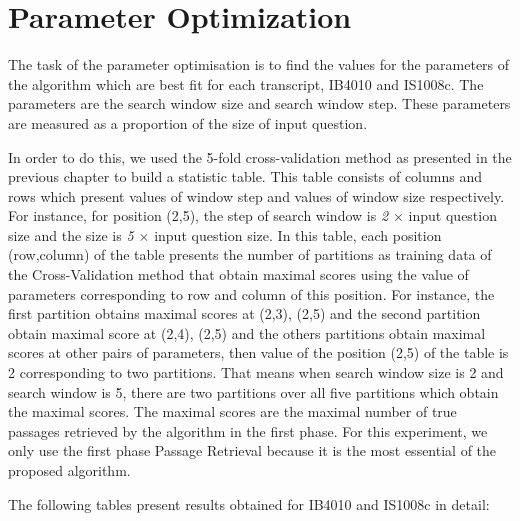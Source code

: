 \normalsize


\section{Parameter Optimization}

The task of the parameter optimisation is to find the values for the parameters of the algorithm which are best fit for each transcript, IB4010 and IS1008c. The parameters are the search window size and search window step. These parameters are measured as a proportion of the size of input question. 

In order to do this, we used the 5-fold cross-validation method as presented in the previous chapter to build a statistic table. This table consists of columns and rows which present values of window step and values of window size respectively. For instance, for position (2,5), the step of search window is \textit{2 \ensuremath{\times}} input question size and the size is \textit{5 \ensuremath{\times}} input question size. In this table, each position (row,column) of the table presents the number of partitions as training data of the Cross-Validation method that obtain maximal scores using the value of parameters corresponding to row and column of this position. For instance, the first partition obtains maximal scores at (2,3), (2,5) and the second partition obtain maximal score at (2,4), (2,5) and the others partitions obtain maximal scores at other pairs of parameters, then value of the position (2,5) of the table is 2 corresponding to two partitions. That means when search window size is 2 and search window is 5, there are two partitions over all five partitions which obtain the maximal scores. The maximal scores are the maximal number of true passages retrieved by the algorithm in the first phase. For this experiment, we only use the first phase Passage Retrieval because it is the most essential of the proposed algorithm.

The following tables present results obtained for IB4010 and IS1008c in detail:


